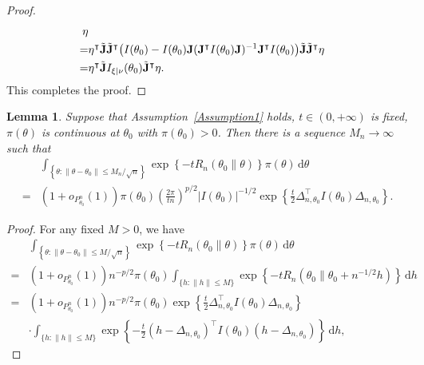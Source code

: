 \documentclass[11pt]{article}
\newcommand{\myT}{\intercal}
\theoremstyle{plain}
\newtheorem{lemma}{\quad\quad Lemma}
\theoremstyle{definition}
\theoremstyle{remark}
\begin{document}
\begin{appendices}
\begin{proof}
\begin{align*}
\eta
\\
=&
\eta^\myT 
         \tilde \BJ \tilde \BJ^\myT 
             \big(
             I(\theta_0)
            -
            I(\theta_0) \BJ (\BJ^\myT  I(\theta_0) \BJ)^{-1} \BJ^\myT  I(\theta_0)
        \big)
         \tilde \BJ \tilde \BJ^\myT 
\eta
\\
=&
\eta^\myT 
         \tilde \BJ 
         I_{\xi | \nu} (\theta_0)
         \tilde \BJ^\myT 
         \eta.
\end{align*}
This completes the proof.
    \end{proof}





\begin{lemma}
    Suppose that Assumption~\ref{Assumption1} holds, $t\in (0,+\infty)$ is fixed,  $\pi(\theta)$ is continuous at $\theta_0$ with $\pi(\theta_0)>0$.
        Then there is a sequence $M_n \to \infty$ such that
        \begin{align*}
&
    \int_{\left\{ \theta: \|\theta - \theta_0\| \leq M_n/\sqrt n \right\}}
    \exp\left\{-t R_n(\theta_0\| \theta) \right\} \pi(\theta)
\, \mathrm d \theta
\\
=&
    (1+o_{P^n_{\theta_0}}(1))
    \pi(\theta_0)
    \left(\frac{2\pi}{t n}\right)^{{p}/{2}}
    |I(\theta_0)|^{-{1}/{2}} 
    \exp
    \left\{ 
        \frac{t}{2}\Delta_{n,\theta_0}^\myT  I({\theta_0})\Delta_{n,\theta_0}
\right\}
    .
        \end{align*}
    \label{prop:lowerBoud}
\end{lemma}
\begin{proof}
    For any fixed $M>0$, we have
    \begin{align*}
& \int_{\left\{ \theta: \|\theta - \theta_0\| \leq M/\sqrt n \right\}}
\exp \left\{-t R_n(\theta_0\| \theta) \right\} \pi(\theta)
\, \mathrm d \theta
    \\
    =
    &
    (1+o_{P^n_{\theta_0}}(1))
    n^{-p/2} \pi(\theta_0)
    \int_{\{h:\|h\|\leq M\}}\exp\left\{ - t R_n(\theta_0\|\theta_0+n^{-1/2}h)\right\} \, \mathrm d h
    \\
    =&
    (1+o_{P^n_{\theta_0}}(1))
    n^{-p/2}\pi(\theta_0)
    \exp\left\{ 
        \frac{t}{2}\Delta_{n,\theta_0}^\myT  I({\theta_0})\Delta_{n,\theta_0}
    \right\}
    \\
    &
    \cdot
    \int_{\{h:\|h\|\leq M\}}\exp\left\{ -\frac{t}{2}(h-\Delta_{n,\theta_0})^\myT  I({\theta_0})(h-\Delta_{n,\theta_0})\right\} \, \mathrm dh
,
\end{align*}

\end{proof}
\end{appendices}
\end{document}
